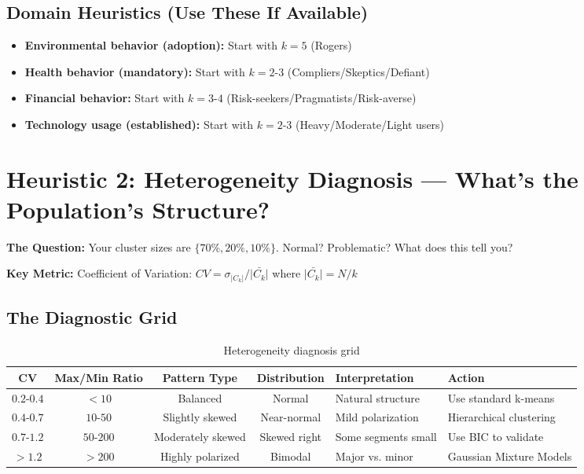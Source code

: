 \subsection{Domain Heuristics (Use These If Available)}

\begin{itemize}[nosep]
\item \textbf{Environmental behavior (adoption):} Start with $k = 5$ (Rogers)
\item \textbf{Health behavior (mandatory):} Start with $k = 2$-$3$ (Compliers/Skeptics/Defiant)
\item \textbf{Financial behavior:} Start with $k = 3$-$4$ (Risk-seekers/Pragmatists/Risk-averse)
\item \textbf{Technology usage (established):} Start with $k = 2$-$3$ (Heavy/Moderate/Light users)
\end{itemize}


\section{Heuristic 2: Heterogeneity Diagnosis --- What's the Population's Structure?}
\label{sec:h2-heterogeneity}

\textbf{The Question:} Your cluster sizes are $\{70\%, 20\%, 10\%\}$. Normal? Problematic? What does this tell you?

\textbf{Key Metric:} Coefficient of Variation: $CV = \sigma_{|C_k|} / \bar{|C_k|}$ where $\bar{|C_k|} = N/k$

\subsection{The Diagnostic Grid}

\begin{table}[h]
\centering
\small
\begin{tabular}{ccccll}
\toprule
\textbf{CV} & \textbf{Max/Min Ratio} & \textbf{Pattern Type} & \textbf{Distribution} & \textbf{Interpretation} & \textbf{Action} \\
\midrule
$0.2$-$0.4$ & $< 10$ & Balanced & Normal & Natural structure & Use standard k-means \\
$0.4$-$0.7$ & $10$-$50$ & Slightly skewed & Near-normal & Mild polarization & Hierarchical clustering \\
$0.7$-$1.2$ & $50$-$200$ & Moderately skewed & Skewed right & Some segments small & Use BIC to validate \\
$> 1.2$ & $> 200$ & Highly polarized & Bimodal & Major vs. minor & Gaussian Mixture Models \\
\bottomrule
\end{tabular}
\caption{Heterogeneity diagnosis grid}
\label{tab:h2-heterogeneity}
\end{table}

